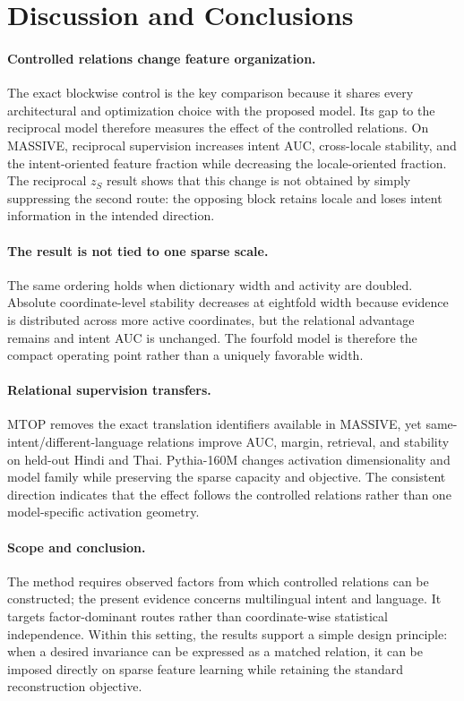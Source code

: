 \documentclass[11pt]{article}
\begin{document}
\section{Discussion and Conclusions}

\paragraph{Controlled relations change feature organization.}
The exact blockwise control is the key comparison because it shares every architectural and optimization choice with the proposed model. Its gap to the reciprocal model therefore measures the effect of the controlled relations. On MASSIVE, reciprocal supervision increases intent AUC, cross-locale stability, and the intent-oriented feature fraction while decreasing the locale-oriented fraction. The reciprocal $z_S$ result shows that this change is not obtained by simply suppressing the second route: the opposing block retains locale and loses intent information in the intended direction.

\paragraph{The result is not tied to one sparse scale.}
The same ordering holds when dictionary width and activity are doubled. Absolute coordinate-level stability decreases at eightfold width because evidence is distributed across more active coordinates, but the relational advantage remains and intent AUC is unchanged. The fourfold model is therefore the compact operating point rather than a uniquely favorable width.

\paragraph{Relational supervision transfers.}
MTOP removes the exact translation identifiers available in MASSIVE, yet same-intent/different-language relations improve AUC, margin, retrieval, and stability on held-out Hindi and Thai. Pythia-160M changes activation dimensionality and model family while preserving the sparse capacity and objective. The consistent direction indicates that the effect follows the controlled relations rather than one model-specific activation geometry.

\paragraph{Scope and conclusion.}
The method requires observed factors from which controlled relations can be constructed; the present evidence concerns multilingual intent and language. It targets factor-dominant routes rather than coordinate-wise statistical independence. Within this setting, the results support a simple design principle: when a desired invariance can be expressed as a matched relation, it can be imposed directly on sparse feature learning while retaining the standard reconstruction objective.



\clearpage
\onecolumn
\appendix

\end{document}
